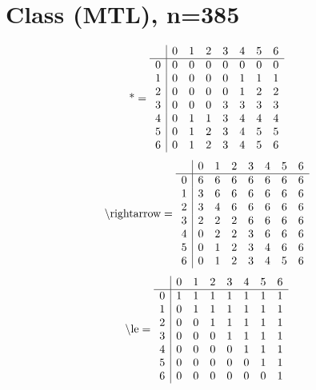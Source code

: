 \documentclass[11pt]{article}
\begin{document}
\section{Class (MTL), n=385}
\[\text{*} = 
\begin{array}{r | r r r r r r r}
 & 0 & 1 & 2 & 3 & 4 & 5 & 6 \\ \hline
0 & 0 & 0 & 0 & 0 & 0 & 0 & 0 \\
1 & 0 & 0 & 0 & 0 & 1 & 1 & 1 \\
2 & 0 & 0 & 0 & 0 & 1 & 2 & 2 \\
3 & 0 & 0 & 0 & 3 & 3 & 3 & 3 \\
4 & 0 & 1 & 1 & 3 & 4 & 4 & 4 \\
5 & 0 & 1 & 2 & 3 & 4 & 5 & 5 \\
6 & 0 & 1 & 2 & 3 & 4 & 5 & 6 \\
\end{array}
\]
\[\text{\textbackslash rightarrow} = 
\begin{array}{r | r r r r r r r}
 & 0 & 1 & 2 & 3 & 4 & 5 & 6 \\ \hline
0 & 6 & 6 & 6 & 6 & 6 & 6 & 6 \\
1 & 3 & 6 & 6 & 6 & 6 & 6 & 6 \\
2 & 3 & 4 & 6 & 6 & 6 & 6 & 6 \\
3 & 2 & 2 & 2 & 6 & 6 & 6 & 6 \\
4 & 0 & 2 & 2 & 3 & 6 & 6 & 6 \\
5 & 0 & 1 & 2 & 3 & 4 & 6 & 6 \\
6 & 0 & 1 & 2 & 3 & 4 & 5 & 6 \\
\end{array}
\]
\[\text{\textbackslash le} = 
\begin{array}{r | r r r r r r r}
 & 0 & 1 & 2 & 3 & 4 & 5 & 6 \\ \hline
0 & 1 & 1 & 1 & 1 & 1 & 1 & 1 \\
1 & 0 & 1 & 1 & 1 & 1 & 1 & 1 \\
2 & 0 & 0 & 1 & 1 & 1 & 1 & 1 \\
3 & 0 & 0 & 0 & 1 & 1 & 1 & 1 \\
4 & 0 & 0 & 0 & 0 & 1 & 1 & 1 \\
5 & 0 & 0 & 0 & 0 & 0 & 1 & 1 \\
6 & 0 & 0 & 0 & 0 & 0 & 0 & 1 \\
\end{array}
\]
\end{document}
